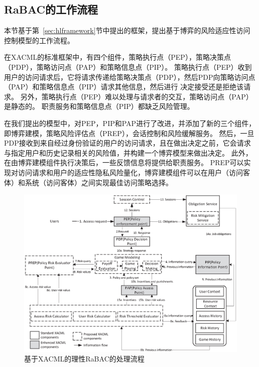 \subsection{RaBAC的工作流程}


本节基于第~\ref{sec:hlframework}节中提出的框架，提出基于博弈的风险适应性访问控制模型的工作流程。

在XACML的标准框架中，有四个组件，策略执行点（PEP），策略决策点（PDP），策略访问点（PAP）和策略信息点（PIP）。 策略执行点（PEP）收到用户的访问请求后，它将请求传递给策略决策点（PDP），然后PDP向策略访问点（PAP）和策略信息点（PIP）请求其他信息，然后进行 决定接受还是拒绝该请求。 另外，策略执行点（PEP）难以处理与请求者的交互，策略访问点（PAP）是静态的。 职责服务和策略信息点（PIP）都缺乏风险管理。


在我们提出的模型中，对PEP，PIP和PAP进行了改进，并添加了新的三个组件，即博弈建模，策略风险评估点（PREP），会话控制和风险缓解服务。 然后，一旦PDP接收到来自经过身份验证的用户的访问请求，且在做出决定之前，它会请求与指定用户和历史记录相关的风险值，并构建一个博弈模型来做出决定。 此外，在由博弈建模组件执行决策后，一些反馈信息将提供给职责服务。 PREP可以实现对访问请求和用户的适应性隐私风险量化，博弈建模组件可以在用户（访问客体）和系统（访问客体）之间实现最佳访问策略选择。

\begin{figure}[htb]
	\centering
	\includegraphics[width=1\textwidth]{./figures/game-rbac-workflow.eps}
	\caption{基于XACML的理性RaBAC的处理流程}\label{fig:game-rbac-workflow}
\end{figure}


